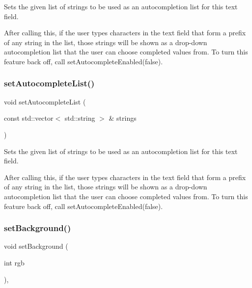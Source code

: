 Sets the given list of strings to be used as an autocompletion list for this text field. 

After calling this, if the user types characters in the text field that form a prefix of any string in the list, those strings will be shown as a drop-\/down autocompletion list that the user can choose completed values from. To turn this feature back off, call set\+Autocomplete\+Enabled(false). \mbox{\label{classGTextField_aee449aad44655f02ed75727b3f6dd4d6}} 
\subsubsection{\texorpdfstring{set\+Autocomplete\+List()}{setAutocompleteList()}\hspace{0.1cm}{\footnotesize\ttfamily [2/2]}}
{\footnotesize\ttfamily void set\+Autocomplete\+List (\begin{DoxyParamCaption}\item[{const std\+::vector$<$ std\+::string $>$ \&}]{strings }\end{DoxyParamCaption})\hspace{0.3cm}{\ttfamily [virtual]}}



Sets the given list of strings to be used as an autocompletion list for this text field. 

After calling this, if the user types characters in the text field that form a prefix of any string in the list, those strings will be shown as a drop-\/down autocompletion list that the user can choose completed values from. To turn this feature back off, call set\+Autocomplete\+Enabled(false). \mbox{\label{classGInteractor_acba7e546c2025c0a15ca4b4cc92043db}} 
\subsubsection{\texorpdfstring{set\+Background()}{setBackground()}\hspace{0.1cm}{\footnotesize\ttfamily [1/2]}}
{\footnotesize\ttfamily void set\+Background (\begin{DoxyParamCaption}\item[{int}]{rgb }\end{DoxyParamCaption})\hspace{0.3cm}{\ttfamily [virtual]}, {\ttfamily [inherited]}}



